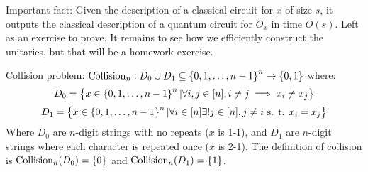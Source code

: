 Important fact: Given the description of a classical circuit for $x$ of size $s$, it outputs the classical description of a quantum circuit for $O_x$ in time $O(s)$. Left as an exercise to prove. It remains to see how we efficiently construct the unitaries, but that will be a homework exercise. 

Collision problem: $\text{Collision}_n: D_0 \cup D_1 \subseteq \set{0, 1, \ldots, n-1}^n \to \set{0, 1}$ where:
\begin{equation}
    D_0 = \set{x \in \set{0, 1, \ldots, n-1}^n \vert \forall i, j \in [n], i \neq j \implies x_i \neq x_j}
\end{equation}
\begin{equation}
    D_1 = \set{x \in \set{0, 1, \ldots, n-1}^n \vert \forall i \in [n] \exists ! j \in [n], j \neq i \text{ s. t. } x_i = x_j}
\end{equation}
Where $D_0$ are $n$-digit strings with no repeats ($x$ is 1-1), and $D_1$ are $n$-digit strings where each character is repeated once ($x$ is 2-1). The definition of collision is $\text{Collision}_n(D_0) = \set{0}$ and $\text{Collision}_n(D_1) = \set{1}$. 

